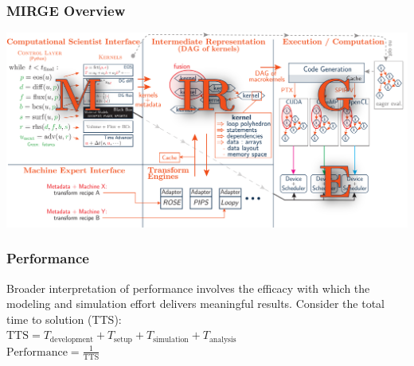 \documentclass{beamer}
\begin{document}
\begin{frame}\frametitle{MIRGE Overview}
\includegraphics[width=\textwidth]{figures/controllayerMIRGE-new.pdf}
\end{frame}

\begin{frame}\frametitle{Performance}
\begin{center}
Broader interpretation of performance involves the efficacy with which the modeling and simulation effort delivers meaningful results. Consider the total time to solution (TTS):\\
\vspace{40pt}
$\text{TTS} = T_\text{development} + T_\text{setup} + T_\text{simulation} + T_\text{analysis}$\\ 
\vspace{20pt}
$\text{Performance} = \frac{1}{\text{TTS}}$
\end{center}
\end{frame}
\end{document}
